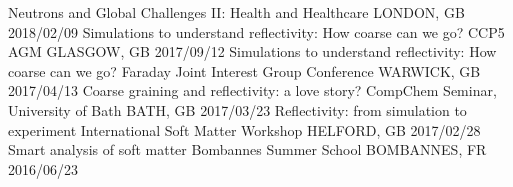 \begin{cvhonors}
    {Neutrons and Global Challenges II: Health and Healthcare}
    {LONDON, GB}
    {2018/02/09}
  \cvhonor
    {Simulations to understand reflectivity: How coarse can we go?}
    {CCP5 AGM}
    {GLASGOW, GB}
    {2017/09/12}
  \cvhonor
    {Simulations to understand reflectivity: How coarse can we go?}
    {Faraday Joint Interest Group Conference}
    {WARWICK, GB}
    {2017/04/13}
  \cvhonor
    {Coarse graining and reflectivity: a love story?}
    {CompChem Seminar, University of Bath}
    {BATH, GB}
    {2017/03/23}
  \cvhonor
    {Reflectivity: from simulation to experiment}
    {International Soft Matter Workshop}
    {HELFORD, GB}
    {2017/02/28}
  \cvhonor
    {Smart analysis of soft matter}
    {Bombannes Summer School}
    {BOMBANNES, FR}
    {2016/06/23}
\end{cvhonors}
